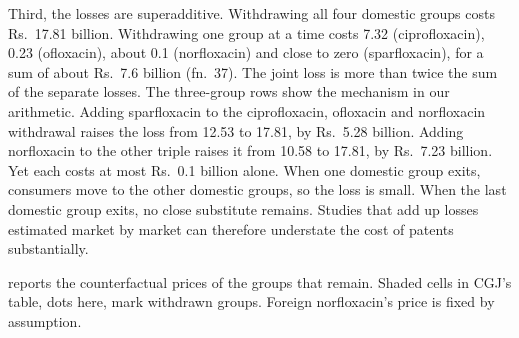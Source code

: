 Third, the losses are superadditive. Withdrawing all four domestic groups costs Rs.~17.81 billion. Withdrawing one
group at a time costs 7.32 (ciprofloxacin), 0.23 (ofloxacin), about 0.1 (norfloxacin) and close to zero (sparfloxacin),
for a sum of about Rs.~7.6 billion (fn.~37). The joint loss is more than twice the sum of the separate losses. The
three-group rows show the mechanism in our arithmetic. Adding sparfloxacin to the ciprofloxacin, ofloxacin and
norfloxacin withdrawal raises the loss from 12.53 to 17.81, by Rs.~5.28 billion. Adding norfloxacin to the other
triple raises it from 10.58 to 17.81, by Rs.~7.23 billion. Yet each costs at most Rs.~0.1 billion alone. When one
domestic group exits, consumers move to the other domestic groups, so the loss is small. When the last domestic group
exits, no close substitute remains. Studies that add up losses estimated market by market can therefore understate
the cost of patents substantially.

  reports the counterfactual prices of the groups that remain. Shaded cells
in CGJ's table, dots here, mark withdrawn groups. Foreign norfloxacin's price is fixed by assumption.

